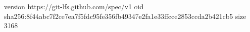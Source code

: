 version https://git-lfs.github.com/spec/v1
oid sha256:8f44abc7f2ce7ea7f5fdc95fe356fb49347e2fa1e33ffcce2853ccda2b421cb5
size 3168
